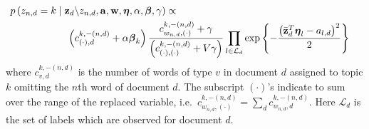 \begin{eqnarray}
\lefteqn{p\left(z_{n,d}=k\mid\mathbf{z}_d\backslash z_{n,d},\mathbf{a},\mathbf{w},\mathbf{\boldsymbol\eta},\alpha,\boldsymbol\beta,\gamma\right)\propto}\nonumber \\
 & \hspace{2cm}\left(c_{\left(\cdot\right),d}^{k,-\left(n,d\right)}+\alpha\boldsymbol\beta_{k}\right)\frac{c_{w_{n,d},\left(\cdot\right)}^{k,-\left(n,d\right)}+\gamma}{\left(c_{\left(\cdot\right),\left(\cdot\right)}^{k,-\left(n,d\right)}+V\gamma\right)}\prod_{l\in\mathcal{L}_{d}}\exp\left\{ -\frac{\left(\bar{\mathbf{z}}_{d}^{T}\boldsymbol\eta_{l}-a_{l,d}\right)^{2}}{2}\right\} \label{eq:z-likelihood}\end{eqnarray}
 where $c_{v,d}^{k,-\left(n,d\right)}$ is the number
of words of type $v$ in document $d$ assigned to topic $k$ omitting
the $n$th word of document $d$. The subscript $(\cdot)$'s
indicate to sum over the range of the replaced variable, i.e.~$ {c_{w_{n,d},\left(\cdot\right)}^{k,-\left(n,d\right)}} = \sum_d {c_{w_{n,d},d}^{k,-\left(n,d\right)}}$.  Here $\mathcal{L}_{d}$ is the set of labels which are observed for document $d$.


